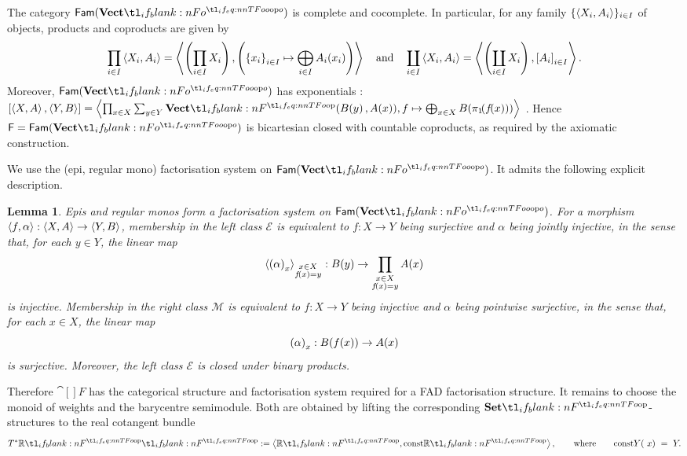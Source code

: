 \documentclass[11pt,a4paper]{article}
\newtheorem{lemma}[theorem]{Lemma}
\theoremstyle{definition}
\theoremstyle{remark}
\providecommand{\const}{\mathrm{const}}
\providecommand{\Fam}[1]{\mathsf{Fam}(#1)}
\begin{document}
The category \( \Fam{\Vect[o]} \) is complete and cocomplete. In particular,
for any family \( \{\left\langle X_i,A_i\right\rangle\}_{i\in I} \) of objects, products and
coproducts are given by
\begin{equation}
	\label{eq:definition-product-coproduct-fam-vectop}
	\prod_{i \in I} \tuple{ X_{i}, A_{i} } =
	\tuple{
		\left(
		\prod_{i \in I} X_{i}
		\right),
		\left(
		\left\{ x_{i} \right\}_{i \in I}
		\mapsto
		\bigoplus_{i \in I} \Fun[nn]{ A_{i} }{ x_{i} }
		\right)
	}
	\qq{and}
	\coprod_{i \in I} \tuple{ X_{i}, A_{i} } =
	\tuple{
		\left(
		\coprod_{i \in I} X_{i}
		\right),
		\cotupling{A_{i}}_{i \in I}
	}.
\end{equation}
Moreover, \( \Fam{\Vect[o]} \) has exponentials
\cite[Proposition~74]{lucatellinunesCHADExpressiveTotal2023}:
\([\tuple{X,A},\tuple{Y,B}] = \tuple{\prod_{x\in X}\sum_{y \in Y}\Vect(\Fun[nn]{B}{y}, \Fun[nn]{A}{x}),f\mapsto \bigoplus_{x\in X}\Fun[np]{B}{
\fn[n]{\pi_1\!}{\fn[n]{f\!}{x}}}}\) .
Hence \( \cat[]{F}=\Fam{\Vect[o]} \) is bicartesian closed with countable
coproducts, as required by the axiomatic construction.

We use the (epi, regular mono) factorisation system on \( \Fam{\Vect[o]} \).
It admits the following explicit description.

\begin{lemma}
	Epis and regular monos form a factorisation system on \( \Fam{\Vect[o]} \).
	For a morphism
	\( \left\langle f,\alpha\right\rangle:\left\langle X,A\right\rangle\to\left\langle Y,B\right\rangle \), membership in the left
	class \( \mathcal{E} \) is equivalent to \(f:X\to Y\) being surjective and
	\( \alpha \) being jointly injective, in the sense that, for each \(y\in Y\),
	the linear map
	\[
	\tupling{\Nat[nn]{ \alpha }{ x }}_{\substack{x \in X \\ \fn[n]{ f }{ x } = y}}:
	\Fun[nn]{ B }{ y }
	\to
	\prod_{\substack{x \in X \\ \fn[n]{ f }{ x } = y}}
	\Fun[nn]{ A }{ x }
	\]
	is injective. Membership in the right class \( \mathcal{M} \) is equivalent
	to \(f:X\to Y\) being injective and \( \alpha \) being pointwise surjective,
	in the sense that, for each \(x\in X\), the linear map
	\[
	\Nat[nn]{ \alpha }{ x }:
	\Fun[np]{ B }{ \fn[n]{ f }{ x } }
	\to
	\Fun[nn]{ A }{ x }
	\]
	is surjective. Moreover, the left class \( \mathcal{E} \) is closed under
	binary products.
\end{lemma}

Therefore \( \cat[]{F} \) has the categorical structure and factorisation
system required for a FAD factorisation structure. It remains to choose the
monoid of weights and the barycentre semimodule. Both are obtained by lifting
the corresponding \( \Set \)-structures to the real cotangent bundle
\[
\TR := \tuple{\R,\const\R},\qquad\text{where}\qquad \Fun[pn]{\const Y}{\ x}\ =\ Y.
\]
\end{document}
